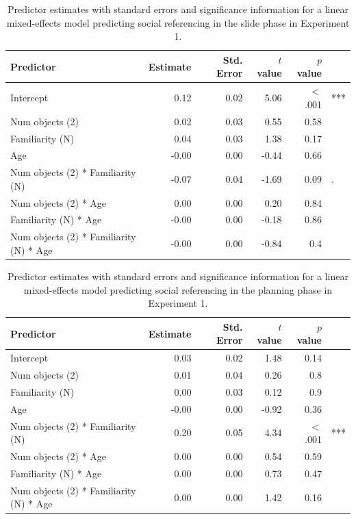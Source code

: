 \documentclass[a4paper,man,apacite,floatsintext]{apa6}
\begin{document}
\begin{table}[b]
\centering
\begin{tabular}{lrrrrl}
 Predictor & Estimate & Std. Error & $t$ value & $p$ value &  \\ 
  \hline
Intercept & 0.12 & 0.02 & 5.06 & $<$ .001 & *** \\ 
  Num objects (2) & 0.02 & 0.03 & 0.55 & 0.58 &  \\ 
  Familiarity (N) & 0.04 & 0.03 & 1.38 & 0.17 &  \\ 
  Age & -0.00 & 0.00 & -0.44 & 0.66 &  \\ 
  Num objects (2) * Familiarity (N) & -0.07 & 0.04 & -1.69 & 0.09 & . \\ 
  Num objects (2) * Age & 0.00 & 0.00 & 0.20 & 0.84 &  \\ 
  Familiarity (N) * Age & -0.00 & 0.00 & -0.18 & 0.86 &  \\ 
  Num objects (2) * Familiarity (N) * Age & -0.00 & 0.00 & -0.84 & 0.4 &  \\ 
   \hline
\end{tabular}
\caption{Predictor estimates with standard errors and significance information for a linear mixed-effects model predicting social referencing in the slide phase in Experiment 1.} 
\label{tab:exp1_s_reg}
\end{table}

\begin{table}[b]
\centering
\begin{tabular}{lrrrrl}
 Predictor & Estimate & Std. Error & $t$ value & $p$ value &  \\ 
  \hline
Intercept & 0.03 & 0.02 & 1.48 & 0.14 &  \\ 
  Num objects (2) & 0.01 & 0.04 & 0.26 & 0.8 &  \\ 
  Familiarity (N) & 0.00 & 0.03 & 0.12 & 0.9 &  \\ 
  Age & -0.00 & 0.00 & -0.92 & 0.36 &  \\ 
  Num objects (2) * Familiarity (N) & 0.20 & 0.05 & 4.34 & $<$ .001 & *** \\ 
  Num objects (2) * Age & 0.00 & 0.00 & 0.54 & 0.59 &  \\ 
  Familiarity (N) * Age & 0.00 & 0.00 & 0.73 & 0.47 &  \\ 
  Num objects (2) * Familiarity (N) * Age & 0.00 & 0.00 & 1.42 & 0.16 &  \\ 
   \hline
\end{tabular}
\caption{Predictor estimates with standard errors and significance information for a linear mixed-effects model predicting social referencing in the planning phase in Experiment 1.} 
\label{tab:exp1_p_reg}
\end{table}
\end{document}
